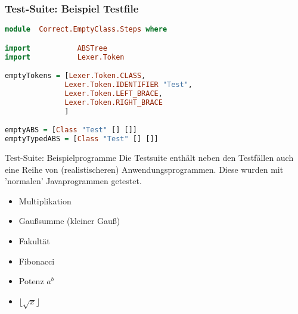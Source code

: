 \begin{frame}[fragile]
\frametitle{Test-Suite: Beispiel Testfile}
\begin{lstlisting}[language=Haskell]
module  Correct.EmptyClass.Steps where

import           ABSTree
import           Lexer.Token

emptyTokens = [Lexer.Token.CLASS,
              Lexer.Token.IDENTIFIER "Test",
              Lexer.Token.LEFT_BRACE,
              Lexer.Token.RIGHT_BRACE
              ]

emptyABS = [Class "Test" [] []]
emptyTypedABS = [Class "Test" [] []]	
\end{lstlisting}
	
\end{frame}

\begin{frame}{Test-Suite: Beispielprogramme}
Die Testsuite enthält neben den Testfällen auch eine Reihe von (realistischeren) Anwendungsprogrammen. Diese wurden mit 'normalen' Javaprogrammen getestet.

\pause

\begin{itemize}
	\item Multiplikation \pause 
	\item Gaußsumme (kleiner Gauß) \pause
	\item Fakultät \pause
	\item Fibonacci \pause
	\item Potenz $a^b$ \pause 
	\item $\lfloor \sqrt{x} \rfloor$
\end{itemize}	
\end{frame}


